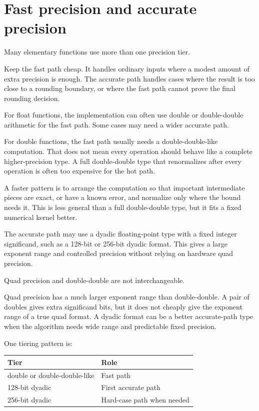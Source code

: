 \documentclass[manuscript, nonacm]{acmart}
\begin{document}


  \section{Fast precision and accurate precision}

  Many elementary functions use more than one precision tier.

  Keep the fast path cheap. It handles ordinary inputs where a modest amount of
  extra precision is enough. The accurate path handles cases where
  the result is too close to a rounding boundary, or where the fast path cannot
  prove the final rounding decision.

  For float functions, the implementation can often use double or double-double
  arithmetic for the fast path. Some cases may need a wider accurate path.

  For double functions, the fast path usually needs a double-double-like
  computation. That does not mean every operation should behave like a complete
  higher-precision type. A full double-double type that renormalizes after
  every operation is often too expensive for the hot path.

  A faster pattern is to arrange the computation so that important intermediate
  pieces are exact, or have a known error, and normalize only where the bound
  needs it. This is less general than a full double-double type, but it fits a
  fixed numerical kernel better.

  The accurate path may use a dyadic floating-point type with a fixed integer
  significand, such as a 128-bit or 256-bit dyadic format. This gives a large
  exponent range and controlled precision without relying on hardware quad
  precision.

  Quad precision and double-double are not interchangeable.

  Quad precision has a much larger exponent range than double-double. A pair
  of doubles gives extra significand bits, but it does not cheaply give the
  exponent range of a true quad format. A dyadic format can be a better
  accurate-path type when the algorithm needs wide range and predictable fixed
  precision.

  One tiering pattern is:

  \begin{table}[tbp]
    \centering
    \begin{tabular}{ll}
      \toprule
      Tier                         & Role                       \\
      \midrule
      double or double-double-like & Fast path                  \\
      128-bit dyadic               & First accurate path        \\
      256-bit dyadic               & Hard-case path when needed \\
      \bottomrule
    \end{tabular}
  \end{table}
\end{document}
